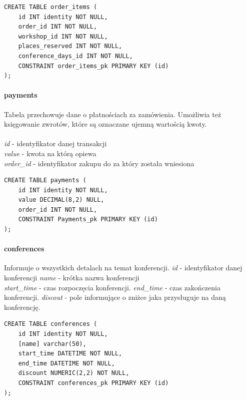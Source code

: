 \documentclass[12pt]{article}
\begin{document}
\begin{lstlisting}
CREATE TABLE order_items (
	id INT identity NOT NULL,
	order_id INT NOT NULL,
	workshop_id INT NOT NULL,
	places_reserved INT NOT NULL,
	conference_days_id INT NOT NULL,
	CONSTRAINT order_items_pk PRIMARY KEY (id)
);
\end{lstlisting}

\paragraph{payments \\}
Tabela przechowuje dane o płatnościach za zamówienia. Umożliwia też księgowanie zwrotów, które są oznaczane ujemną wartością kwoty. \\ \\
\textit{id} - identyfikator danej transakcji \\
\textit{value} - kwota na którą opiewa \\
\textit{order\_id} - identyfikator zakupu do za który została wniesiona \\
\begin{lstlisting}
CREATE TABLE payments (
	id INT identity NOT NULL,
	value DECIMAL(8,2) NULL,
	order_id INT NOT NULL,
	CONSTRAINT Payments_pk PRIMARY KEY (id)
);
\end{lstlisting}
\paragraph{conferences \newline}
Informuje o wszystkich detalach na temat konferencji. \newline \newline
\textit{id} - identyfikator danej konferencji \newline
\textit{name} - krótka nazwa konferencji \\
\textit{start\_time} - czas rozpoczęcia konferencji. \newline
\textit{end\_time} - czas zakończenia konferencji. \newline
\textit{discout} - pole informujące o zniżce jaka przysługuje na daną konferencję. \newline
\begin{lstlisting}
CREATE TABLE conferences (
	id INT identity NOT NULL,
	[name] varchar(50),
	start_time DATETIME NOT NULL,
	end_time DATETIME NOT NULL,
	discount NUMERIC(2,2) NOT NULL,
	CONSTRAINT conferences_pk PRIMARY KEY (id)
);

\end{lstlisting}
\end{document}
